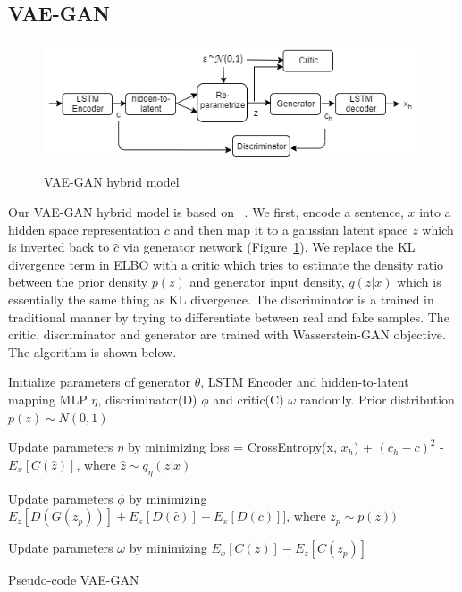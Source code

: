 \documentclass{article}
\begin{document}
\subsection{VAE-GAN}
\begin{figure}[htp]
    \centering
    \centering
    \includegraphics[height=0.25\textwidth,width=\textwidth]{vaegan-Page-1.png}
    \label{fig:vaegan}
    \caption{VAE-GAN hybrid model}
\end{figure}
Our VAE-GAN hybrid model is based on ~\cite{rosca2017variational}. We first, encode a sentence, $x$ into a hidden space representation $c$ and then map it to a gaussian latent space $z$ which is inverted back to $\hat{c}$ via generator network (Figure~\ref{fig:vaegan}). We replace the KL divergence term in ELBO with a critic which tries to estimate the density ratio between the prior density $p(z)$ and generator input density, $q(z|x)$ which is essentially the same thing as KL divergence. The discriminator is a trained in traditional manner by trying to differentiate between real and fake samples. The critic, discriminator and generator are trained with Wasserstein-GAN objective. The algorithm is shown below.

\begin{algorithm}
\begin{algorithmic}
 \item Initialize parameters of generator $\theta$, LSTM Encoder and hidden-to-latent mapping MLP $\eta$, discriminator(D) $\phi$ and critic(C) $\omega$ randomly. Prior distribution $p(z) \sim N(0,1)$ \\
 \item Update parameters $\eta$ by minimizing loss = CrossEntropy(x, $x_h$) + $(c_h - c)^2$ - $E_x[C(\hat{z})]$, where $\hat{z} \sim q_\eta(z|x)$ \\
 \item Update parameters $\phi$ by minimizing $E_z[D(G(z_p))] + E_x[D(\hat{c})] - E_x[D(c)]]$, where $z_p \sim p(z))$ \\
 \item Update parameters $\omega$ by minimizing $E_x[C(z)] - E_z[C(z_p)]$ \\
 \ENDWHILE
 \caption{Pseudo-code VAE-GAN}
 \end{algorithmic}
\end{algorithm}
\end{document}
